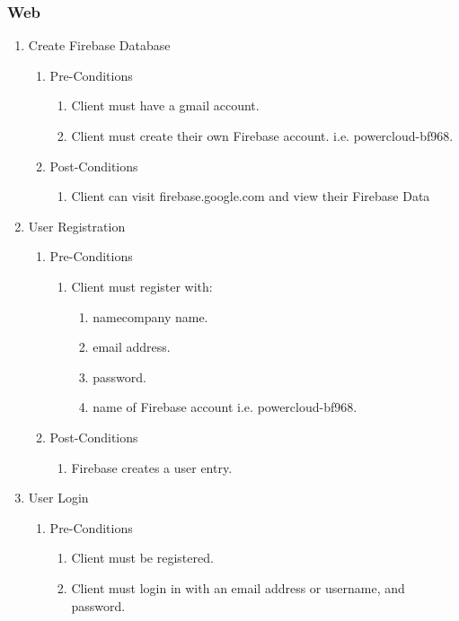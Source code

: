 \documentclass{article}
\begin{document}
	\subsubsection{Web}
		\begin{enumerate}
	\item	Create Firebase Database
	\begin{enumerate}
		\item  Pre-Conditions
		\begin{enumerate}
			\item	Client must have a gmail account.
			\item	Client must create their own Firebase account. i.e. powercloud-bf968.
		\end{enumerate}
		\item  Post-Conditions		
		\begin{enumerate}
			\item	Client can visit firebase.google.com and view their Firebase Data
		\end{enumerate}
	\end{enumerate}
	\item	User Registration
	\begin{enumerate}
		\item  Pre-Conditions
		\begin{enumerate}
			\item	Client must register with:
			\begin{enumerate}
				\item	namecompany name.
				\item	email address.
				\item	password.
				\item	name of Firebase account i.e. powercloud-bf968.
			\end{enumerate}
		\end{enumerate}
		\item  Post-Conditions		
		\begin{enumerate}
			\item	Firebase creates a user entry.
		\end{enumerate}
	\end{enumerate}
	\item	User Login
	\begin{enumerate}
		\item  Pre-Conditions
		\begin{enumerate}
			\item	Client must be registered.
			\item	Client must login in with an email address or username, and password.

\end{enumerate}
\end{enumerate}
\end{enumerate}
\end{document}
